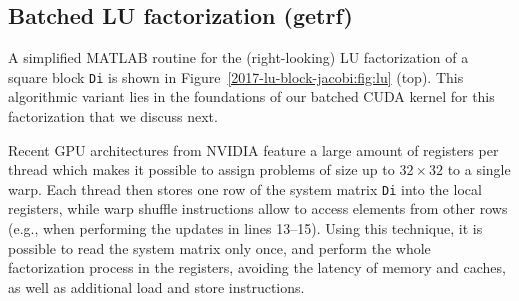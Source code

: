 \subsection{Batched LU factorization ({\sc getrf})}

A simplified MATLAB routine for the
(right-looking) LU factorization of a square block \texttt{Di} is shown in Figure~\ref{2017-lu-block-jacobi:fig:lu} (top).
This algorithmic variant lies in the foundations of our batched CUDA kernel for this factorization that
we discuss next.

Recent GPU architectures from NVIDIA 
feature a large amount of registers per thread
which makes it possible to assign problems of size up to $32 \times 32$
to a single warp.
Each thread then stores one row of the system matrix \texttt{Di}
into the local registers,
while warp shuffle instructions
allow to access elements from other rows
(e.g., when performing the updates in lines 13--15).
Using this technique, it is possible to read the system matrix only once,
and perform the whole factorization process in the registers,
avoiding the latency of memory and caches,
as well as additional load and store instructions.

